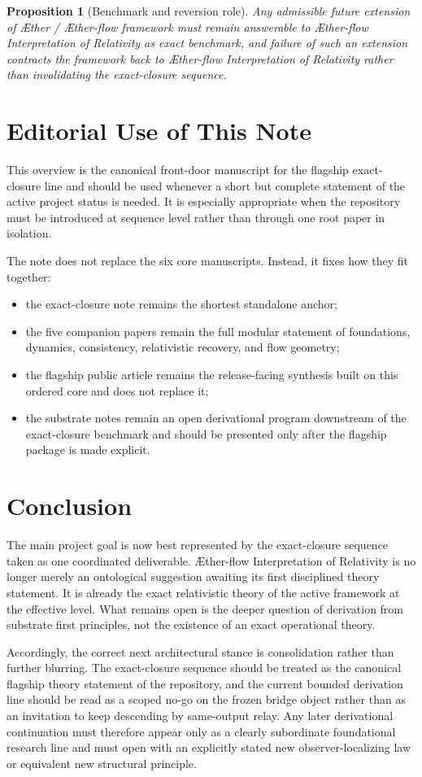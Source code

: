 \documentclass[11pt]{article}
\newcommand{\Aether}{\AE{}ther}
\newcommand{\Aflow}{\AE{}ther-flow}
\newcommand{\TheoryName}{\Aflow{} Interpretation of Relativity}
\newcommand{\TheoryProgram}{\Aether{} / \Aflow{} framework}
\newtheorem{proposition}{Proposition}
\begin{document}
\begin{proposition}[Benchmark and reversion role]
Any admissible future extension of \TheoryProgram{} must remain answerable to \TheoryName{} as exact benchmark, and failure of such an extension contracts the framework back to \TheoryName{} rather than invalidating the exact-closure sequence.
\end{proposition}

\section{Editorial Use of This Note}

This overview is the canonical front-door manuscript for the flagship exact-closure line and should be used whenever a short but complete statement of the active project status is needed. It is especially appropriate when the repository must be introduced at sequence level rather than through one root paper in isolation.

The note does not replace the six core manuscripts. Instead, it fixes how they fit together:
\begin{itemize}
    \item the exact-closure note remains the shortest standalone anchor;
    \item the five companion papers remain the full modular statement of foundations, dynamics, consistency, relativistic recovery, and flow geometry;
    \item the flagship public article remains the release-facing synthesis built on this ordered core and does not replace it;
    \item the substrate notes remain an open derivational program downstream of the exact-closure benchmark and should be presented only after the flagship package is made explicit.
\end{itemize}

\section{Conclusion}

The main project goal is now best represented by the exact-closure sequence taken as one coordinated deliverable. \TheoryName{} is no longer merely an ontological suggestion awaiting its first disciplined theory statement. It is already the exact relativistic theory of the active framework at the effective level. What remains open is the deeper question of derivation from substrate first principles, not the existence of an exact operational theory.

Accordingly, the correct next architectural stance is consolidation rather than further blurring. The exact-closure sequence should be treated as the canonical flagship theory statement of the repository, and the current bounded derivation line should be read as a scoped no-go on the frozen bridge object rather than as an invitation to keep descending by same-output relay. Any later derivational continuation must therefore appear only as a clearly subordinate foundational research line and must open with an explicitly stated new observer-localizing law or equivalent new structural principle.


\end{document}
